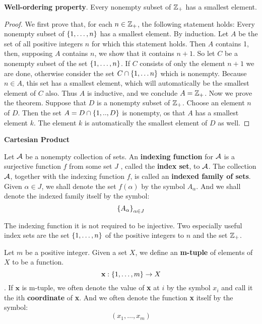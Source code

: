 \begin{thm}
	\textbf{Well-ordering property}. Every nonempty subset of $ \mathbb{Z}_+ $ has a smallest element.
\end{thm}

\begin{proof}
	We first prove that, for each $ n \in \mathbb{Z}_+ $, the following statement holds: Every nonempty subset of $ \left\lbrace 1, \ldots, n \right\rbrace $ has a smallest element.
	By induction. Let $A$ be the set of all positive integers $ n $ for which this statement holds. Then $ A $ contains 1, then, supposing $ A $ contains $ n $, we show that it contains $ n+1 $. So let $ C $ be a nonempty subset of the set $ \left\lbrace 1, \ldots, n \right\rbrace $. If $ C $ consists of only the element $ n+1 $ we are done, otherwise consider the set $ C \cap \left\lbrace 1, \ldots n \right\rbrace $ which is nonempty. Because $ n \in A $, this set has a smallest element, which will automatically be the smallest element of $C$ also. Thus $A$ is inductive, and we conclude $ A=\mathbb{Z}_+ $. Now we prove the theorem. Suppose that $D$ is a nonempty subset of $\mathbb{Z}_+$. Choose an element $n$ of $D$. Then the set $A = D \cap \left\lbrace 1,..,D \right\rbrace$ is nonempty, os that $A$ has a smallest element $k$. The element $k$ is automatically the smallest element of $D$ as well.
\end{proof}

\textbf{ \LARGE Cartesian Product}

\begin{define}
	Let $ \mathcal{A} $ be a nonempty collection of sets. An \textbf{indexing function } for $ \mathcal{A} $ is a surjective function $f$ from some set $J$ , called the \textbf{index set}, to $ \mathcal{A} $. The collection $ \mathcal{A} $, together with the indexing function $f$, is called an \textbf{indexed family of sets}. Given $ \alpha \in J $, we shall denote the set $ f(\alpha) $ by the symbol $ A_\alpha $. And we shall denote the indexed family itself by the symbol:
	\[ \left\lbrace A_\alpha \right\rbrace_{\alpha \in J} \]
	
\end{define}

The indexing function it is not required to be injective. Two especially useful index sets are the set $ \left\lbrace 1, \ldots,n \right\rbrace $ of the positive integers to $n$ and the set $ \mathbb{Z}_+ $.

\begin{define}
	Let $m$ be a positive integer. Given a set $X$, we define an \textbf{m-tuple } of elements of $X$ to be a function.
	\[ \textbf{x}: \left\lbrace 1, \ldots, m \right\rbrace \rightarrow X \].
	If $\textbf{x}$ is m-tuple, we often denote the value of \textbf{x} at $i$ by the symbol $x_i$ and call it the ith \textbf{coordinate} of \textbf{x}. And we often denote the function \textbf{x} itself by the symbol:
	\[ (x_1, \ldots,x_m) \]
\end{define}

